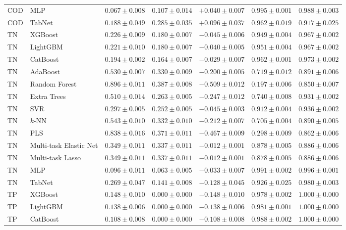\begin{longtable}{lp{3.1cm}rrrrr}
COD & MLP & $0.067\pm0.008$ & $0.107\pm0.014$ & $+0.040\pm0.007$ & $0.995\pm0.001$ & $0.988\pm0.003$ \\
COD & TabNet & $0.188\pm0.049$ & $0.285\pm0.035$ & $+0.096\pm0.037$ & $0.962\pm0.019$ & $0.917\pm0.025$ \\
TN & XGBoost & $0.226\pm0.009$ & $0.180\pm0.007$ & $-0.045\pm0.006$ & $0.949\pm0.004$ & $0.967\pm0.002$ \\
TN & LightGBM & $0.221\pm0.010$ & $0.180\pm0.007$ & $-0.040\pm0.005$ & $0.951\pm0.004$ & $0.967\pm0.002$ \\
TN & CatBoost & $0.194\pm0.002$ & $0.164\pm0.007$ & $-0.029\pm0.007$ & $0.962\pm0.001$ & $0.973\pm0.002$ \\
TN & AdaBoost & $0.530\pm0.007$ & $0.330\pm0.009$ & $-0.200\pm0.005$ & $0.719\pm0.012$ & $0.891\pm0.006$ \\
TN & Random Forest & $0.896\pm0.011$ & $0.387\pm0.008$ & $-0.509\pm0.012$ & $0.197\pm0.006$ & $0.850\pm0.007$ \\
TN & Extra Trees & $0.510\pm0.014$ & $0.263\pm0.005$ & $-0.247\pm0.012$ & $0.740\pm0.008$ & $0.931\pm0.002$ \\
TN & SVR & $0.297\pm0.005$ & $0.252\pm0.005$ & $-0.045\pm0.003$ & $0.912\pm0.004$ & $0.936\pm0.002$ \\
TN & $k$-NN & $0.543\pm0.010$ & $0.332\pm0.010$ & $-0.212\pm0.007$ & $0.705\pm0.004$ & $0.890\pm0.005$ \\
TN & PLS & $0.838\pm0.016$ & $0.371\pm0.011$ & $-0.467\pm0.009$ & $0.298\pm0.009$ & $0.862\pm0.006$ \\
TN & Multi-task Elastic Net & $0.349\pm0.011$ & $0.337\pm0.011$ & $-0.012\pm0.001$ & $0.878\pm0.005$ & $0.886\pm0.006$ \\
TN & Multi-task Lasso & $0.349\pm0.011$ & $0.337\pm0.011$ & $-0.012\pm0.001$ & $0.878\pm0.005$ & $0.886\pm0.006$ \\
TN & MLP & $0.096\pm0.011$ & $0.063\pm0.005$ & $-0.033\pm0.007$ & $0.991\pm0.002$ & $0.996\pm0.001$ \\
TN & TabNet & $0.269\pm0.047$ & $0.141\pm0.008$ & $-0.128\pm0.045$ & $0.926\pm0.025$ & $0.980\pm0.003$ \\
TP & XGBoost & $0.148\pm0.010$ & $0.000\pm0.000$ & $-0.148\pm0.010$ & $0.978\pm0.002$ & $1.000\pm0.000$ \\
TP & LightGBM & $0.138\pm0.006$ & $0.000\pm0.000$ & $-0.138\pm0.006$ & $0.981\pm0.001$ & $1.000\pm0.000$ \\
TP & CatBoost & $0.108\pm0.008$ & $0.000\pm0.000$ & $-0.108\pm0.008$ & $0.988\pm0.002$ & $1.000\pm0.000$ \\

\end{longtable}
